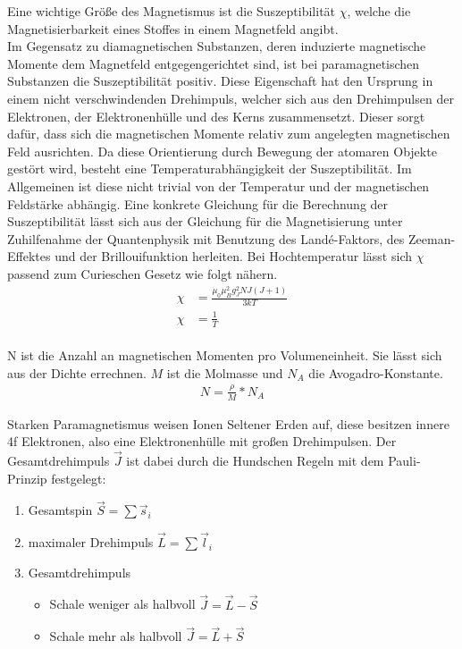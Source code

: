 Eine wichtige Größe des Magnetismus ist die Suszeptibilität $\chi$, welche die Magnetisierbarkeit 
eines Stoffes in einem Magnetfeld angibt.\\ 
Im Gegensatz zu diamagnetischen Substanzen, deren induzierte magnetische Momente dem Magnetfeld 
entgegengerichtet sind, ist bei paramagnetischen Substanzen die Suszeptibilität positiv.
Diese Eigenschaft hat den Ursprung in einem nicht verschwindenden Drehimpuls, welcher sich aus
den Drehimpulsen der Elektronen, der Elektronenhülle und des Kerns zusammensetzt. Dieser sorgt dafür,
dass sich die magnetischen Momente relativ zum angelegten magnetischen Feld ausrichten. Da diese 
Orientierung durch Bewegung der atomaren Objekte gestört wird, besteht eine Temperaturabhängigkeit
der Suszeptibilität. Im Allgemeinen ist diese nicht trivial von der Temperatur und der magnetischen 
Feldstärke abhängig. Eine konkrete Gleichung für die Berechnung der Suszeptibilität lässt sich
aus der Gleichung für die Magnetisierung unter Zuhilfenahme der Quantenphysik mit Benutzung des 
Landé-Faktors, des Zeeman-Effektes und der Brillouifunktion herleiten. Bei Hochtemperatur lässt
sich $\chi$ passend zum Curieschen Gesetz wie folgt nähern.
\begin{align}
\chi&=\frac{\mu_0 \mu_B^2 g_J^2 N J(J+1)}{3 k T} \\
\chi&=\frac{1}{T}
\label{eqn:curie}
\end{align}
\\
N ist die Anzahl an magnetischen Momenten pro Volumeneinheit. Sie lässt sich aus der Dichte errechnen. $M$ ist die Molmasse und $N_A$ die Avogadro-Konstante.
\begin{align}
N=\frac{\rho}{M}*N_A
\end{align}

Starken Paramagnetismus weisen Ionen Seltener Erden auf, diese besitzen innere 4f Elektronen, also 
eine Elektronenhülle mit großen Drehimpulsen. Der Gesamtdrehimpuls $\vec J$ ist dabei durch die
Hundschen Regeln mit dem Pauli-Prinzip \cite{anleitung} festgelegt:
	\begin{table}[h]
			\begin{enumerate}
				\item Gesamtspin $\vec S=\sum \vec s_i$ 
				\item maximaler Drehimpuls $\vec L=\sum \vec l_i$ 
				\item Gesamtdrehimpuls 
				\begin{itemize}
					\item Schale weniger als halbvoll $\vec J=\vec L - \vec S$
					\item Schale mehr als halbvoll $\vec J=\vec L + \vec S$
				\end{itemize}
			\end{enumerate}
	\label{hund}
	\end{table}
\FloatBarrier